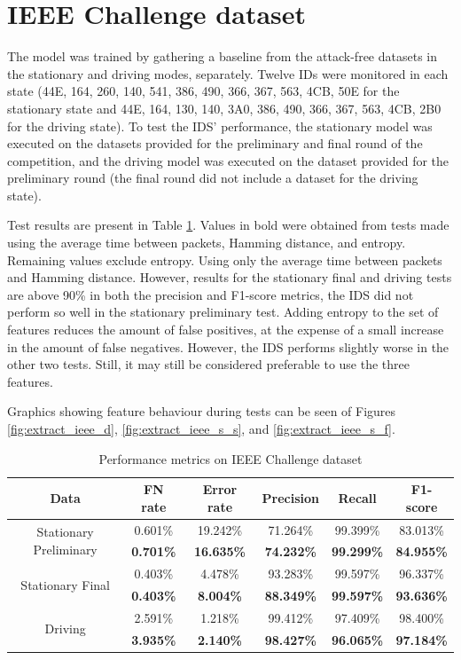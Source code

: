 \section{IEEE Challenge dataset}

The model was trained by gathering a baseline from the attack-free datasets in the stationary and driving modes, separately. Twelve IDs were monitored in each state (44E, 164, 260, 140, 541, 386, 490, 366, 367, 563, 4CB, 50E for the stationary state and 44E, 164, 130, 140, 3A0, 386, 490, 366, 367, 563, 4CB, 2B0 for the driving state). To test the IDS' performance, the stationary model was executed on the datasets provided for the preliminary and final round of the competition, and the driving model was executed on the dataset provided for the preliminary round (the final round did not include a dataset for the driving state).\par
Test results are present in Table \ref{tab:perf_ieee_challenge}. Values in bold were obtained from tests made using the average time between packets, Hamming distance, and entropy. Remaining values exclude entropy. Using only the average time between packets and Hamming distance. However, results for the stationary final and driving tests are above 90\% in both the precision and F1-score metrics, the IDS did not perform so well in the stationary preliminary test. Adding entropy to the set of features reduces the amount of false positives, at the expense of a small increase in the amount of false negatives. However, the IDS performs slightly worse in the other two tests. Still, it may still be considered preferable to use the three features.\par
Graphics showing feature behaviour during tests can be seen of Figures \ref{fig:extract_ieee_d}, \ref{fig:extract_ieee_s_s}, and \ref{fig:extract_ieee_s_f}.

\begin{table}
    \centering
    \begin{tabular}{*{6}{c}}
        \toprule
        \textbf{Data} & \textbf{FN rate} & \textbf{Error rate} & \textbf{Precision} & \textbf{Recall} & \textbf{F1-score}\\
        \midrule
        \multirow{2}{*}{Stationary Preliminary} & 0.601\% & 19.242\% & 71.264\% & 99.399\% & 83.013\%\\
        & \textbf{0.701\%} & \textbf{16.635\%} & \textbf{74.232\%} & \textbf{99.299\%} & \textbf{84.955\%}\\
        \multirow{2}{*}{Stationary Final} & 0.403\% & 4.478\% & 93.283\% & 99.597\% & 96.337\%\\
        & \textbf{0.403\%} & \textbf{8.004\%} & \textbf{88.349\%} & \textbf{99.597\%} & \textbf{93.636\%}\\
        \multirow{2}{*}{Driving} & 2.591\% & 1.218\% & 99.412\% & 97.409\% & 98.400\%\\
        & \textbf{3.935\%} & \textbf{2.140\%} & \textbf{98.427\%} & \textbf{96.065\%} & \textbf{97.184\%}\\
        \bottomrule
    \end{tabular}
    \caption{Performance metrics on IEEE Challenge dataset}
    \label{tab:perf_ieee_challenge}
\end{table}

